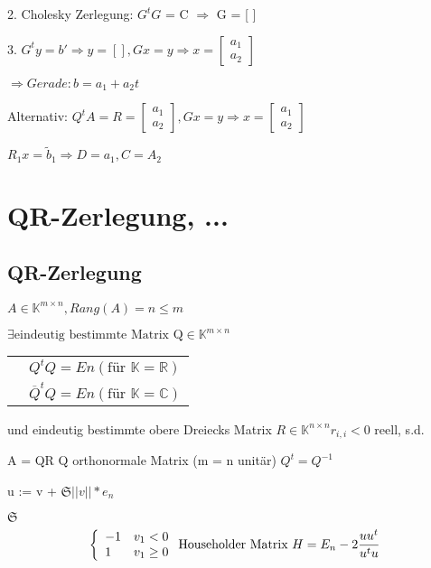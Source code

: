 \documentclass[12pt,a4paper]{article} %
\newcommand*\conj[1]{\overline{#1}}
\newcommand*\tab[1][1cm]{\hspace*{#1}}
\begin{document}
	2. Cholesky Zerlegung: $G^tG$ = C $\Rightarrow$ G = [ ]
	
	3. $G^ty = b' \Rightarrow y = [ ], Gx = y \Rightarrow x = \begin{bmatrix}
		a_1 \\
		a_2
	\end{bmatrix}$
	
	$\Rightarrow Gerade: b = a_1 + a_2t$
	
	Alternativ: $Q^tA = R = \begin{bmatrix}
		a_1 \\
		a_2
	\end{bmatrix}
	, Gx = y \Rightarrow x = \begin{bmatrix}
	a_1 \\
	a_2
	\end{bmatrix}$
	
	$R_1x = \tilde{b}_1 \Rightarrow D = a_1, C = A_2$
	
	\newpage
	
	\section{QR-Zerlegung, ...}
	
	\subsection{QR-Zerlegung}
	
	$A \in \mathbb{K}^{m \times n}, Rang(A) = n \le m$ 
	
	$\exists \text{eindeutig bestimmte Matrix Q} \in \mathbb{K}^{m \times n}$
	\begin{tabular}{l l}
		& $Q^tQ = En (\text{für }\mathbb{K} = \mathbb{R})$  \\
		& $\conj{Q}^t Q = En (\text{für }\mathbb{K} = \mathbb{C})$
	\end{tabular}
	
	und eindeutig bestimmte obere Dreiecks Matrix $R \in \mathbb{K}^{n \times n} r_{i, i} < 0$ reell, s.d.
	
	A = QR \tab Q orthonormale Matrix (m = n unitär) $Q^t = Q^{-1}$
	
	u := v + $\mathfrak{S} ||v|| * e_n$
	
	$\mathfrak{S}$
	\[
		\left \{
			\begin{array}{l l}
				-1 & v_1 < 0 \\
				1 & v_1 \ge 0
			\end{array}
		\right. \text{Householder Matrix }H = E_n - 2 \frac{uu^t}{u^tu}
	\]
	
\end{document}
